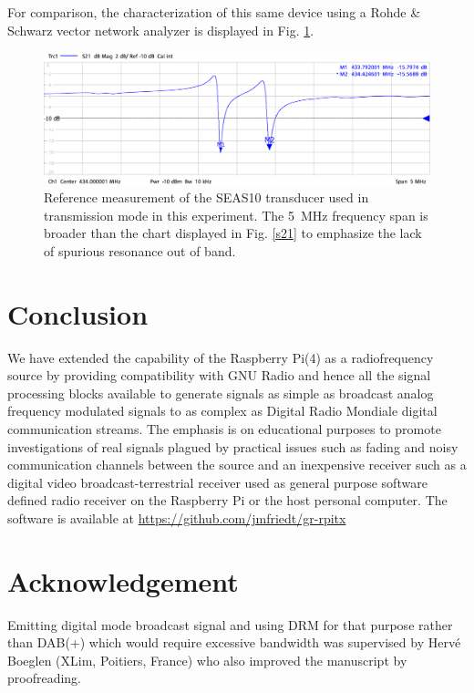 \documentclass{article}
\begin{document}
For comparison, the characterization of this same device using a Rohde \& Schwarz 
vector network analyzer is displayed in Fig. \ref{rs}.

\begin{figure}[h!tb]
\includegraphics[width=\linewidth]{RetS.pdf}
\caption{Reference measurement of the SEAS10 transducer used in transmission mode in this 
experiment. The 5~MHz frequency span is broader than the chart displayed in Fig. \ref{s21}
to emphasize the lack of spurious resonance out of band.}
\label{rs}
\end{figure}

\section{Conclusion}

We have extended the capability of the Raspberry Pi(4) as a radiofrequency source
by providing compatibility with GNU Radio and hence all the signal processing
blocks available to generate signals as simple as broadcast analog frequency
modulated signals to as complex as Digital Radio Mondiale digital communication
streams. The emphasis is on educational purposes to promote investigations of
real signals plagued by practical issues such as fading and noisy communication
channels between the source and an inexpensive receiver such as a digital video
broadcast-terrestrial receiver used as general purpose software defined radio
receiver on the Raspberry Pi or the host personal computer.
The software is available at \url{https://github.com/jmfriedt/gr-rpitx}

\section*{Acknowledgement}

Emitting digital mode broadcast signal and using DRM for that purpose rather
than DAB(+) which would require excessive bandwidth was
supervised by Herv\'e Boeglen (XLim, Poitiers, France) who also improved the 
manuscript by proofreading.



\end{document}
